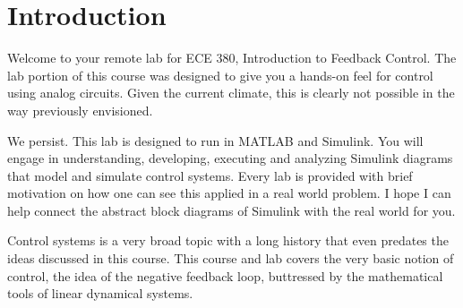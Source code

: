 \chapter{Introduction}
Welcome to your remote lab for ECE 380, Introduction to Feedback Control.
The lab portion of this course was designed to give you a hands-on
feel for control using analog circuits. Given the current climate, this is
clearly not possible in the way previously envisioned.

We persist. This lab is designed to run in MATLAB and Simulink. You will engage
in understanding, developing, executing and analyzing Simulink
diagrams that model and simulate control systems. Every lab is
provided with brief motivation on how one can see this applied in a real
world problem. I hope I can help connect the abstract block diagrams of
Simulink with the real world for you.

Control systems is a very broad topic with a long history that even predates
the ideas discussed in this course. This course and lab covers the very basic
notion of control, the idea of the negative feedback loop, buttressed by
the mathematical tools of linear dynamical systems.

